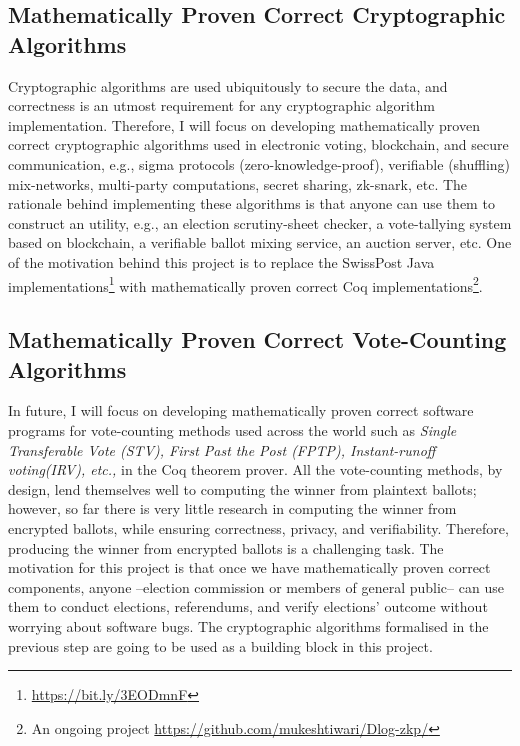 \documentclass[a4paper]{article}
\begin{document}
\subsection{Mathematically Proven Correct Cryptographic Algorithms}
	Cryptographic algorithms are used ubiquitously to secure 
	the data, and correctness is an utmost requirement for 
	any cryptographic algorithm implementation. Therefore, 
	I will focus on developing mathematically proven correct cryptographic 
	algorithms used in electronic voting, blockchain, and secure communication, e.g., 
  	sigma protocols (zero-knowledge-proof), verifiable (shuffling) mix-networks, 
  	multi-party computations, secret sharing, zk-snark, etc.
	The rationale behind implementing these algorithms is that anyone can use them to construct 
	an utility, e.g., an election scrutiny-sheet checker, 
	a vote-tallying system based on blockchain,
	a verifiable ballot mixing service, an auction server, etc. One of the motivation
	behind this project is to replace the SwissPost Java implementations\footnote{\url{https://bit.ly/3EODmnF}} 
	with mathematically proven correct Coq 
	implementations\footnote{An ongoing project \url{https://github.com/mukeshtiwari/Dlog-zkp/}}.

	

	

\subsection{Mathematically Proven Correct Vote-Counting Algorithms}
In future, I will focus on developing mathematically proven correct
software programs for vote-counting methods used across the world
such as \textit{Single Transferable Vote (STV), 
First Past the Post (FPTP), Instant-runoff voting(IRV), etc.,} in the Coq theorem prover. 
All the vote-counting methods, by design, lend themselves well to computing the 
winner from plaintext ballots; however, so far there is very little research in computing 
the winner from encrypted ballots, while ensuring correctness, privacy, and 
verifiability. Therefore, producing the winner from encrypted 
ballots is a challenging task.
The motivation for this project is that once we have  mathematically proven correct 
components, anyone --election commission or members of general public-- can use them 
to conduct elections, referendums, and verify elections' outcome 
without worrying about software bugs.  The cryptographic algorithms formalised in 
the previous step are going to be used as a building block in this project.
\end{document}
